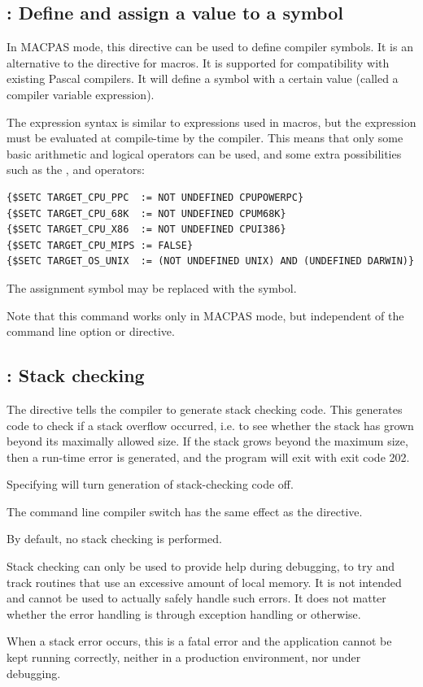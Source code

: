 \subsection{ : Define and assign a value to a symbol}

In MACPAS mode, this directive can be used to define compiler symbols. It is
an alternative to the  directive for macros. It is supported for 
compatibility with existing \macos Pascal compilers. It will define a symbol
with a certain value (called a compiler variable expression). 

The expression syntax is similar to expressions used in macros, but the
expression must be evaluated at compile-time by the compiler. This means
that only some basic arithmetic and logical operators can be used,
and some extra possibilities such as the , and 
operators:
\begin{verbatim}
{$SETC TARGET_CPU_PPC  := NOT UNDEFINED CPUPOWERPC}
{$SETC TARGET_CPU_68K  := NOT UNDEFINED CPUM68K}
{$SETC TARGET_CPU_X86  := NOT UNDEFINED CPUI386}
{$SETC TARGET_CPU_MIPS := FALSE}
{$SETC TARGET_OS_UNIX  := (NOT UNDEFINED UNIX) AND (UNDEFINED DARWIN)}
\end{verbatim}
The \var{:=} assignment symbol may be replaced with the \var{=} symbol.

Note that this command works only in MACPAS mode, but independent of the
 command line option or  directive.

\subsection{ : Stack checking}

The  directive tells the compiler to generate stack checking
code. This generates code to check if a stack overflow occurred, i.e. to see
whether the stack has grown beyond its maximally allowed size. If the stack
grows beyond the maximum size, then a run-time error is generated, and the
program will exit with exit code 202.

Specifying  will turn generation of stack-checking code off.

The command line compiler switch  has the same effect as the
 directive.

By default, no stack checking is performed.

\begin{remark}
Stack checking can only be used to provide help during debugging, to try and 
track routines that use an excessive amount of local memory. It is not
intended and cannot be used to actually safely handle such errors.
It does not matter whether the error handling is through exception 
handling or otherwise.

When a stack error occurs, this is a fatal error and the application cannot 
be kept running correctly, neither in a production environment, nor under 
debugging. 
\end{remark}


